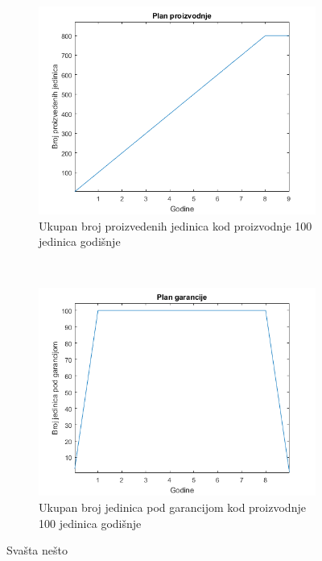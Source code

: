 \documentclass[12pt]{article}
\begin{document}
\begin{figure}[ht!]
    \centering
    \begin{subfigure}[t]{0.45\textwidth}
		\centering
		\includegraphics[scale = 0.5]{plan_proizvodnje/plan_proizvodnje-100}
		\caption{Ukupan broj proizvedenih jedinica kod proizvodnje 100 jedinica godišnje}
    \end{subfigure}%
    ~ 
    \begin{subfigure}[t]{0.45\textwidth}
		\centering
		\includegraphics[scale = 0.5]{plan_proizvodnje/plan_garancije-100}
		\caption{Ukupan broj jedinica pod garancijom kod proizvodnje 100 jedinica godišnje}
    \end{subfigure}
    \caption{Svašta nešto}
\end{figure}
\clearpage
\end{document}
